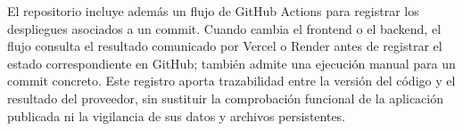 \documentclass[11pt,a4paper]{report}
\begin{document}
El repositorio incluye además un flujo de GitHub Actions para registrar los despliegues asociados a un commit. Cuando cambia el frontend o el backend, el flujo consulta el resultado comunicado por Vercel o Render antes de registrar el estado correspondiente en GitHub; también admite una ejecución manual para un commit concreto. Este registro aporta trazabilidad entre la versión del código y el resultado del proveedor, sin sustituir la comprobación funcional de la aplicación publicada ni la vigilancia de sus datos y archivos persistentes.
\end{document}
